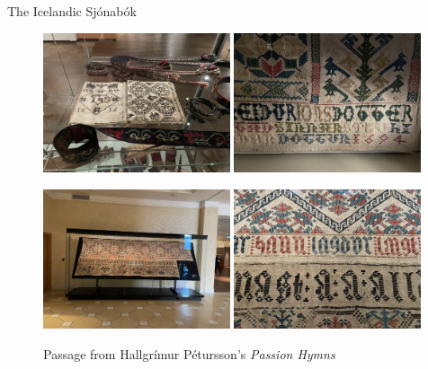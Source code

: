 \documentclass[
    NAME={Dr. Helga Ingimundardóttir},
    EMAIL={helgaingim@hi.is},
    FACULTY={Industrial Engineering},
    TITLE={HiDef Textiles: Reviving Tradition with Innovation},
    SUBTITLE={Empowering Creativity and Sustainability in Textile Production through Digital Transformation},
    SEMINAR={Reykjavík DataBeers},
    DATE={January 25, 2025},
    WIDE={true}
]{HI-LaTeX/hi-beamer}
\begin{document}
\begin{frame}[allowframebreaks]{The Icelandic Sjónabók}
\framebreak

\begin{figure}    \centering
\caption{Manuscript at the Icelandic National Museum}
    \includegraphics[width=0.49\textwidth]{include/sjónabók-safn.jpg}
    \includegraphics[width=0.49\textwidth]{include/jonsdottir.jpg}

\framebreak

    \caption{Passage from Hallgrímur Pétursson's  \textit{Passion Hymns}}
    \includegraphics[width=0.49\textwidth]{include/passiusalmur.jpg}
    \includegraphics[width=0.49\textwidth]{include/passiusalmur-zoom.jpg}



\end{figure}
\end{frame}
\end{document}
